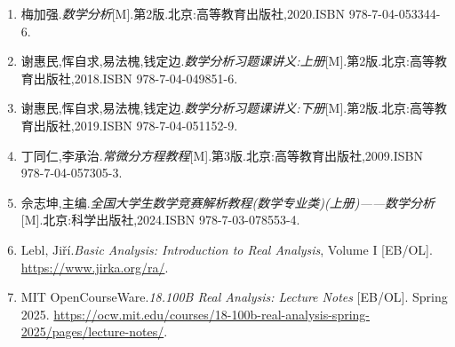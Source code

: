 \documentclass[a4paper,12pt,fleqn,openany,twoside,fontset=windows]{ctexbook}
\begin{document}
\tableofcontents

\clearpage
\let\oldcleardoublepage\cleardoublepage
\let\cleardoublepage\clearpage
\mainmatter
\let\cleardoublepage\oldcleardoublepage
\pagestyle{main}


\def\BookMaster{}








\backmatter
{}
\begin{booknotebody}

\begin{enumerate}[leftmargin=2\ccwd,itemsep=0.55em,topsep=0.4em]
    \item 梅加强.\textit{数学分析}[M].第2版.北京:高等教育出版社,2020.ISBN 978-7-04-053344-6.
    \item 谢惠民,恽自求,易法槐,钱定边.\textit{数学分析习题课讲义:上册}[M].第2版.北京:高等教育出版社,2018.ISBN 978-7-04-049851-6.
    \item 谢惠民,恽自求,易法槐,钱定边.\textit{数学分析习题课讲义:下册}[M].第2版.北京:高等教育出版社,2019.ISBN 978-7-04-051152-9.
    \item 丁同仁,李承治.\textit{常微分方程教程}[M].第3版.北京:高等教育出版社,2009.ISBN 978-7-04-057305-3.
    \item 佘志坤,主编.\textit{全国大学生数学竞赛解析教程(数学专业类)(上册)——数学分析}[M].北京:科学出版社,2024.ISBN 978-7-03-078553-4.
    \item $\text{Lebl, Jiří}$.\enspace\textit{Basic Analysis: Introduction to Real Analysis}, Volume I [EB/OL]. \url{https://www.jirka.org/ra/}.
    \item MIT OpenCourseWare.\enspace\textit{18.100B Real Analysis: Lecture Notes} [EB/OL]. Spring 2025. \url{https://ocw.mit.edu/courses/18-100b-real-analysis-spring-2025/pages/lecture-notes/}.
\end{enumerate}


\end{booknotebody}



\makebackcover
\end{document}

